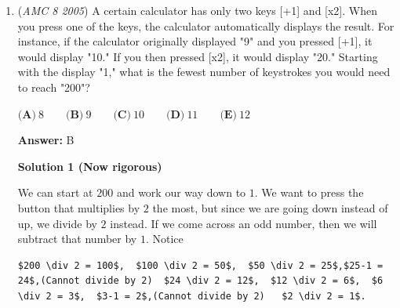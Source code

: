 \begin{enumerate}
$\textbf{(A)}\ 6\qquad\textbf{(B)}\ 8\qquad\textbf{(C)}\ 3\pi\qquad\textbf{(D)}\ 10\qquad\textbf{(E)}\ 4\pi$

 \textbf{Answer: }B



\textbf{Solution}

First, we notice half a square so first let's create a square. Once we have a square, we will have a full circle. This circle has a diameter of 4 which will be the side of the square. The area would be $4\cdot 4 = 16.$ Divide 16 by 2 to get the original shape and you get $\boxed{8}$




\textbf{Solution 2 (Super Fast)}

Well, the question states that it is an Isosceles triangle, so 2 of the side lengths (not the hypotenuse) must be the same. Let us call them x, and the formula for finding the area of a triangle is 1/2(a)(b), if we implement this we get 1/2(x)(x) = x\textasciicircum{}2/2. The only answer which satisfies this condition is B therefore we have solved the question. We can double check as 8x2=16 and the root of 16 = 4.

 $\boxed{\textbf{(B)}\ 8 }$.

 


 


	\item (\textit{AMC 8 2005}) A certain calculator has only two keys [+1] and [x2]. When you press one of the keys, the calculator automatically  displays the result. For instance, if the calculator originally displayed "9" and you pressed [+1], it would display "10." If you then pressed [x2], it would display "20." Starting with the display "1," what is the fewest number of keystrokes you would need to reach "200"?


 $\textbf{(A)}\ 8\qquad\textbf{(B)}\ 9\qquad\textbf{(C)}\ 10\qquad\textbf{(D)}\ 11\qquad\textbf{(E)}\ 12$

 \textbf{Answer: }B



\textbf{Solution 1 (Now rigorous)}

We can start at $200$ and work our way down to $1$. We want to press the button that multiplies by $2$ the most, but since we are going down instead of up, we divide by $2$ instead. If we come across an odd number, then we will subtract that number by $1$. Notice

 \begin{verbatim}
$200 \div 2 = 100$,  $100 \div 2 = 50$,  $50 \div 2 = 25$,$25-1 = 24$,(Cannot divide by 2)  $24 \div 2 = 12$,  $12 \div 2 = 6$,  $6 \div 2 = 3$,  $3-1 = 2$,(Cannot divide by 2)   $2 \div 2 = 1$.   
\end{verbatim}


\end{enumerate}
